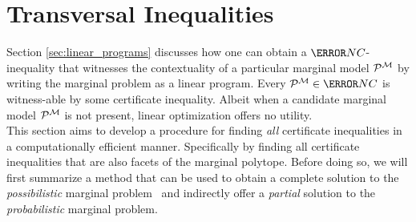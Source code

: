 \documentclass[aps, 10pt, english, twoside, pra, nofootinbib, longbibliography]{revtex4-1}
\begin{document}


    \section{Transversal Inequalities}

    Section \ref{sec:linear_programs} discusses how one can obtain a $\s{NC}$-inequality that witnesses the contextuality of a particular marginal model $\probvec^{\mscenario}$ by writing the marginal problem as a linear program. Every $\probvec^{\mscenario} \in \s{NC}$ is witness-able by some certificate inequality. Albeit when a candidate marginal model $\probvec^{\mscenario}$ is not present, linear optimization offers no utility. \\

    This section aims to develop a procedure for finding \textit{all} certificate inequalities in a computationally efficient manner. Specifically by finding all certificate inequalities that are also facets of the marginal polytope. Before doing so, we will first summarize a method  that can be used to obtain a complete solution to the \textit{possibilistic} marginal problem~\cite{Mansfield_2012} and indirectly offer a \textit{partial} solution to the \textit{probabilistic} marginal problem.
\end{document}
